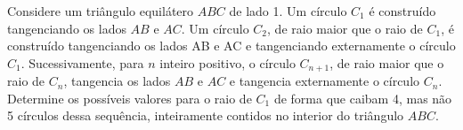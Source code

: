 Considere um triângulo equilátero $ABC$ de lado 1. Um círculo $C_1$ é construído tangenciando os lados $AB$ e $AC$.
Um círculo $C_2$, de raio maior que o raio de $C_1$, é construído tangenciando os lados AB e AC e tangenciando externamente o círculo $C_1$.
Sucessivamente, para $n$ inteiro positivo, o círculo $C_{n+1}$, de raio maior que o raio de $C_n$, tangencia os lados $AB$ e $AC$ e tangencia externamente o círculo $C_n$.
Determine os possíveis valores para o raio de $C_1$ de forma que caibam 4, mas não 5 círculos dessa sequência, inteiramente contidos no interior do triângulo $ABC$.